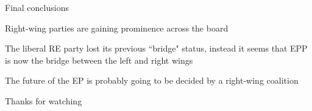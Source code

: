 \documentclass{beamer}
\begin{document}
\begin{frame}{Final conclusions}
	
	\pause Right-wing parties are gaining prominence across the board
	
	\vspace{0.5cm}
	
	\pause The liberal RE party lost its previous ``bridge" status\pause, instead it seems that EPP is now the bridge between the left and right wings
	
	\vspace{0.5cm}
	
	\pause The future of the EP is probably going to be decided by a right-wing coalition
	
\end{frame}

\begin{frame}{}
	
	\centering Thanks for watching
	
\end{frame}
\end{document}
